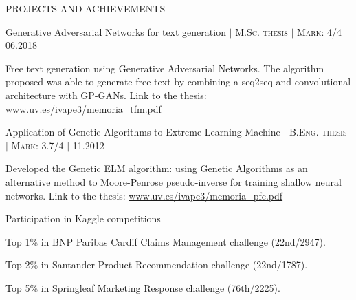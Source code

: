 \documentclass{resume} %
\begin{document}

\begin{rSection}{PROJECTS AND ACHIEVEMENTS}

\begin{rSubsection}{Generative Adversarial Networks for text generation  $|$  \textnormal{\textsc{M.Sc. thesis  $|$  Mark: 4/4}} $|$ \textnormal{06.2018}}{}{}{}  %

\vspace{-3pt}

\item Free text generation using Generative Adversarial Networks. The algorithm proposed was able to generate free text by combining a seq2seq and convolutional architecture with GP-GANs. Link to the thesis: \href{https://www.uv.es/ivape3/memoria_tfm.pdf}{www.uv.es/ivape3/memoria\_tfm.pdf}

\end{rSubsection}

\vspace{-6pt}

\begin{rSubsection}{Application of Genetic Algorithms to Extreme Learning Machine  $|$  \textnormal{\textsc{B.Eng. thesis  $|$  Mark: 3.7/4}} $|$ \textnormal{11.2012}}
{}{}{}  

\vspace{-3pt}

\item Developed the Genetic ELM algorithm: using Genetic Algorithms as an alternative method to Moore-Penrose pseudo-inverse for training shallow neural networks. Link to the thesis: \href{https://www.uv.es/ivape3/memoria_pfc.pdf}{www.uv.es/ivape3/memoria\_pfc.pdf}

\end{rSubsection}

\vspace{-6pt}

\begin{rSubsection}{Participation in Kaggle competitions}
{}{}{}  

\vspace{-3pt}

\item Top 1\% in BNP Paribas Cardif Claims Management challenge (22nd/2947).
\item Top 2\% in Santander Product Recommendation challenge (22nd/1787).
\item Top 5\% in Springleaf Marketing Response challenge (76th/2225).


\end{rSubsection}
\end{rSection}
\end{document}
